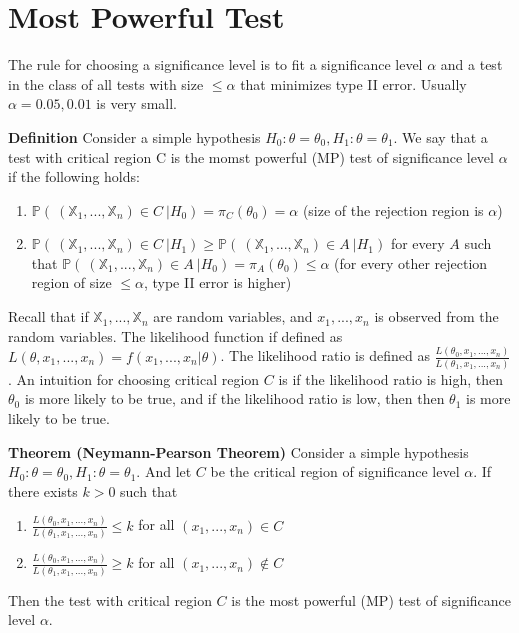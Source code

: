 \section{Most Powerful Test}
The rule for choosing a significance level is to fit a significance level $\alpha$ and a test in the class of all tests with size $\leq \alpha$ that minimizes type II error. Usually $\alpha = 0.05, 0.01$ is very small.

\textbf{Definition} Consider a simple hypothesis $H_0: \theta = \theta_0, H_1: \theta = \theta_1$. We say that a test with critical region C is the momst powerful (MP) test of significance level $\alpha$ if the following holds:
\begin{enumerate}
\item $\mathbb{P}(\ (\mathbb{X}_1, ..., \mathbb{X}_n) \in C\ | H_0 ) = \pi_C(\theta_0) = \alpha$ (size of the rejection region is $\alpha$)
\item $\mathbb{P}(\ (\mathbb{X}_1, ..., \mathbb{X}_n) \in C\ | H_1 ) \geq \mathbb{P}(\ (\mathbb{X}_1, ..., \mathbb{X}_n) \in A\ | H_1 ) $ for every $A$ such that $\mathbb{P}(\ (\mathbb{X}_1, ..., \mathbb{X}_n) \in A\ | H_0 ) = \pi_A(\theta_0) \leq \alpha$ (for every other rejection region of size $\leq \alpha$, type II error is higher)
\end{enumerate}

Recall that if $\mathbb{X}_1, ..., \mathbb{X}_n$ are random variables, and $x_1, ..., x_n$ is observed from the random variables. The likelihood function if defined as $L(\theta, x_1, ..., x_n) = f(x_1, ..., x_n | \theta)$. The likelihood ratio is defined as $\frac{L(\theta_0, x_1, ..., x_n)}{L(\theta_1, x_1, ..., x_n)}$. An intuition for choosing critical region $C$ is if the likelihood ratio is high, then $\theta_0$ is more likely to be true, and if the likelihood ratio is low, then then $\theta_1$ is more likely to be true.
 
\textbf{Theorem (Neymann-Pearson Theorem)}   Consider a simple hypothesis $H_0: \theta = \theta_0, H_1: \theta = \theta_1$. And let $C$ be the critical region of significance level $\alpha$. If there exists $k > 0$ such that
\begin{enumerate}
\item $\frac{L(\theta_0, x_1, ..., x_n)}{L(\theta_1, x_1, ..., x_n)} \leq k$ for all $(x_1, ..., x_n) \in  C$
\item $\frac{L(\theta_0, x_1, ..., x_n)}{L(\theta_1, x_1, ..., x_n)} \geq k$ for all $(x_1, ..., x_n) \notin  C$
\end{enumerate}
Then the test with critical region $C$ is the most powerful (MP) test of significance level $\alpha$.

